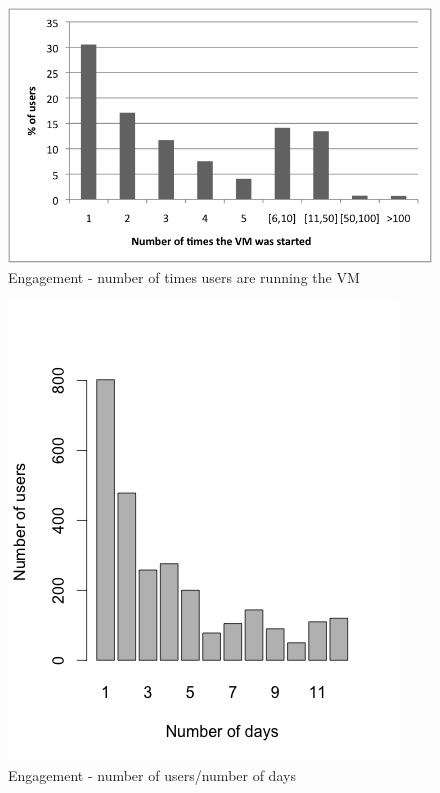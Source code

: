 \documentclass{article}
\begin{document}
      


\begin{figure}[t]
  \begin{center}
		\includegraphics[width=\columnwidth]{imgs/Engagement.png}
  \end{center}
\caption{Engagement - number of times users are running the VM}
\label{img:EngagementVMrunning}
\end{figure}


\begin{figure}[t]
  \begin{center}
		\includegraphics[width=\columnwidth]{imgs/Engagement2.png}
  \end{center}
\caption{Engagement - number of users/number of days}
\label{img:Engagement-days}
\end{figure}
\end{document}
